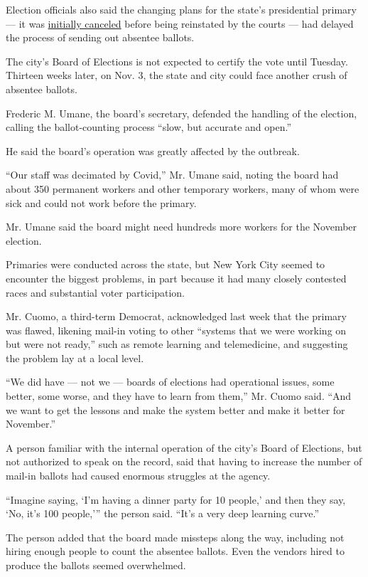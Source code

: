 Election officials also said the changing plans for the state's
presidential primary --- it was
\href{https://www.nytimes3xbfgragh.onion/2020/04/27/us/politics/democratic-primary-canceled-coronavirus.html}{initially
canceled} before being reinstated by the courts --- had delayed the
process of sending out absentee ballots.

The city's Board of Elections is not expected to certify the vote until
Tuesday. Thirteen weeks later, on Nov. 3, the state and city could face
another crush of absentee ballots.

Frederic M. Umane, the board's secretary, defended the handling of the
election, calling the ballot-counting process ``slow, but accurate and
open.''

He said the board's operation was greatly affected by the outbreak.

``Our staff was decimated by Covid,'' Mr. Umane said, noting the board
had about 350 permanent workers and other temporary workers, many of
whom were sick and could not work before the primary.

Mr. Umane said the board might need hundreds more workers for the
November election.

Primaries were conducted across the state, but New York City seemed to
encounter the biggest problems, in part because it had many closely
contested races and substantial voter participation.

Mr. Cuomo, a third-term Democrat, acknowledged last week that the
primary was flawed, likening mail-in voting to other ``systems that we
were working on but were not ready,'' such as remote learning and
telemedicine, and suggesting the problem lay at a local level.

``We did have --- not we --- boards of elections had operational issues,
some better, some worse, and they have to learn from them,'' Mr. Cuomo
said. ``And we want to get the lessons and make the system better and
make it better for November.''

A person familiar with the internal operation of the city's Board of
Elections, but not authorized to speak on the record, said that having
to increase the number of mail-in ballots had caused enormous struggles
at the agency.

``Imagine saying, `I'm having a dinner party for 10 people,' and then
they say, `No, it's 100 people,''' the person said. ``It's a very deep
learning curve.''

The person added that the board made missteps along the way, including
not hiring enough people to count the absentee ballots. Even the vendors
hired to produce the ballots seemed overwhelmed.


